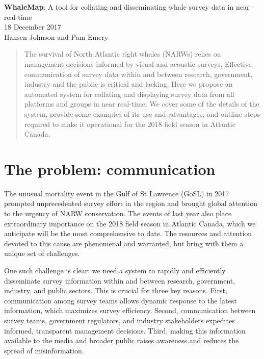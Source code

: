 \documentclass[11pt, letterpaper]{article}
\begin{document}

\begin{center}
	\Large \textbf{WhaleMap}: A tool for collating and disseminating whale survey data in near real-time \\
	\bigskip
	\normalsize 18 December 2017 \\
	\normalsize Hansen Johnson and Pam Emery\\
	\bigskip
\end{center}

\begin{abstract}
	The survival of North Atlantic right whales (NARWs) relies on management decisions informed by visual and acoustic surveys. Effective communication of survey data within and between research, government, industry and the public is critical and lacking. Here we propose an automated system for collating and displaying survey data from all platforms and groups in near real-time. We cover some of the details of the system, provide some examples of its use and advantages, and outline steps required to make it operational for the 2018 field season in Atlantic Canada.
\end{abstract} 


\section{The problem: communication}

The unusual mortality event in the Gulf of St Lawrence (GoSL) in 2017 prompted unprecedented survey effort in the region and brought global attention to the urgency of NARW conservation. The events of last year also place extraordinary importance on the 2018 field season in Atlantic Canada, which we anticipate will be the most comprehensive to date. The resources and attention devoted to this cause are phenomenal and warranted, but bring with them a unique set of challenges. 

One such challenge is clear: we need a system to rapidly and efficiently disseminate survey information within and between research, government, industry, and public sectors. This is crucial for three key reasons. First, communication among survey teams allows dynamic response to the latest information, which maximizes survey efficiency. Second, communication between survey teams, government regulators, and industry stakeholders expedites informed, transparent management decisions. Third, making this information available to the media and broader public raises awareness and reduces the spread of misinformation. 
\end{document}
